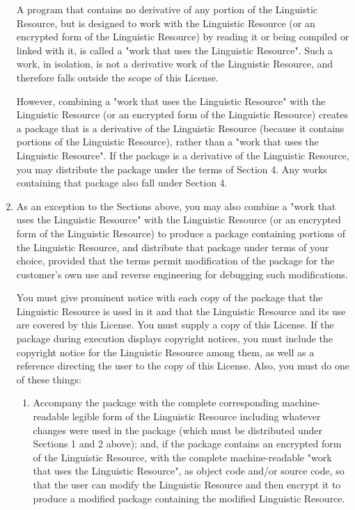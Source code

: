 \begin{enumerate}
A program that contains no derivative of any portion of the Linguistic Resource, but is designed 
to work with the Linguistic Resource (or an encrypted form of the Linguistic Resource) by 
reading it or being compiled or linked with it, is called a "work that uses the Linguistic 
Resource". Such a work, in isolation, is not a derivative work of the Linguistic Resource, 
and therefore falls outside the scope of this License.

However, combining a "work that uses the Linguistic Resource" with the Linguistic Resource 
(or an encrypted form of the Linguistic Resource) creates a package that is a derivative of 
the Linguistic Resource (because it contains portions of the Linguistic Resource), rather than 
a "work that uses the Linguistic Resource". If the package is a derivative of the Linguistic 
Resource, you may distribute the package under the terms of Section 4. Any works containing 
that package also fall under Section 4. 


\item

As an exception to the Sections above, you may also combine a "work that uses the Linguistic 
Resource" with the Linguistic Resource (or an encrypted form of the Linguistic Resource) to 
produce a package containing portions of the Linguistic Resource, and distribute that package 
under terms of your choice, provided that the terms permit modification of the package for the 
customer's own use and reverse engineering for debugging such modifications.

You must give prominent notice with each copy of the package that the Linguistic Resource 
is used in it and that the Linguistic Resource and its use are covered by this License. You 
must supply a copy of this License. If the package during execution displays copyright notices, 
you must include the copyright notice for the Linguistic Resource among them, as well as a 
reference directing the user to the copy of this License. Also, you must do one of these things: 


\begin{enumerate}

\item

Accompany the package with the complete corresponding machine-readable legible form of the 
Linguistic Resource including whatever changes were used in the package (which must be distributed 
under Sections 1 and 2 above); and, if the package contains an encrypted form of the Linguistic 
Resource, with the complete machine-readable "work that uses the Linguistic Resource", as object 
code and/or source code, so that the user can modify the Linguistic Resource and then encrypt it 
to produce a modified package containing the modified Linguistic Resource.


\end{enumerate}
\end{enumerate}
